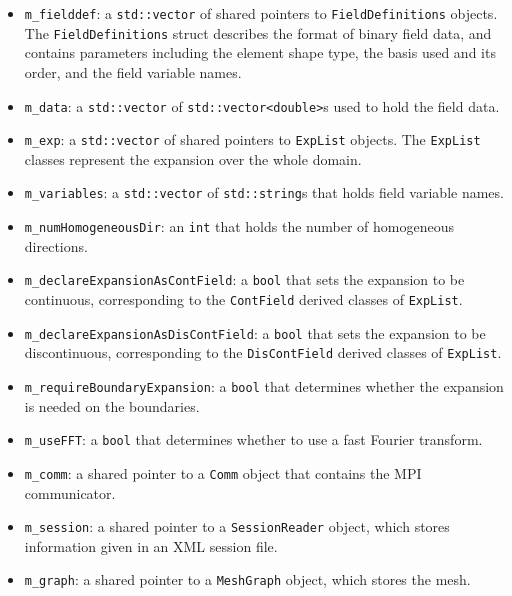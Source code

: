 \begin{itemize}

\item \verb+m_fielddef+: a \verb+std::vector+ of shared pointers to \verb+FieldDefinitions+ objects. The \verb+FieldDefinitions+ struct describes the format of binary field data, and contains parameters including the element shape type, the basis used and its order, and the field variable names.

\item \verb+m_data+: a \verb+std::vector+ of \verb+std::vector<double>+s used to hold the field data.

\item \verb+m_exp+: a \verb+std::vector+ of shared pointers to \verb+ExpList+ objects. The \verb+ExpList+ classes represent the expansion over the whole domain.

\item \verb+m_variables+: a \verb+std::vector+ of \verb+std::string+s that holds field variable names.

\item \verb+m_numHomogeneousDir+: an \verb+int+ that holds the number of homogeneous directions.

\item \verb+m_declareExpansionAsContField+: a \verb+bool+ that sets the expansion to be continuous, corresponding to the \verb+ContField+ derived classes of \verb+ExpList+.

\item \verb+m_declareExpansionAsDisContField+: a \verb+bool+ that sets the expansion to be discontinuous, corresponding to the \verb+DisContField+ derived classes of \verb+ExpList+.

\item \verb+m_requireBoundaryExpansion+: a \verb+bool+ that determines whether the expansion is needed on the boundaries.

\item \verb+m_useFFT+: a \verb+bool+ that determines whether to use a fast Fourier transform. 
    
\item \verb+m_comm+: a shared pointer to a \verb+Comm+ object that contains the MPI communicator.
    
\item \verb+m_session+: a shared pointer to a  \verb+SessionReader+ object, which stores information given in an XML session file.

\item \verb+m_graph+: a shared pointer to a \verb+MeshGraph+ object, which stores the mesh.


\end{itemize}
